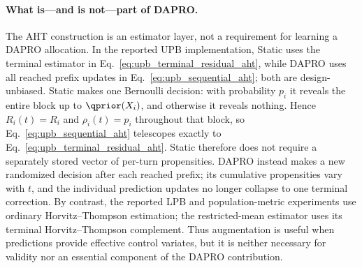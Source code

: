 \paragraph{What is—and is not—part of DAPRO.}
The AHT construction is an estimator layer, not a requirement for learning a
DAPRO allocation. In the reported UPB implementation, Static uses the
terminal estimator in Eq.~\eqref{eq:upb_terminal_residual_aht}, while DAPRO
uses all reached prefix updates in Eq.~\eqref{eq:upb_sequential_aht}; both are
design-unbiased. Static makes one Bernoulli decision: with probability \(p_i\)
it reveals the entire block up to \(\qprior(X_i)\), and otherwise it reveals
nothing. Hence \(R_i(t)=R_i\) and \(\rho_i(t)=p_i\) throughout that block, so
Eq.~\eqref{eq:upb_sequential_aht} telescopes exactly to
Eq.~\eqref{eq:upb_terminal_residual_aht}. Static therefore does not require a
separately stored vector of per-turn propensities. DAPRO instead makes a new
randomized decision after each reached prefix; its cumulative propensities
vary with \(t\), and the individual prediction updates no longer collapse to
one terminal correction. By contrast, the reported LPB and population-metric
experiments use ordinary Horvitz--Thompson estimation; the restricted-mean
estimator uses its terminal Horvitz--Thompson complement. Thus augmentation is
useful when predictions provide effective control variates, but it is neither
necessary for validity nor an essential component of the DAPRO contribution.
